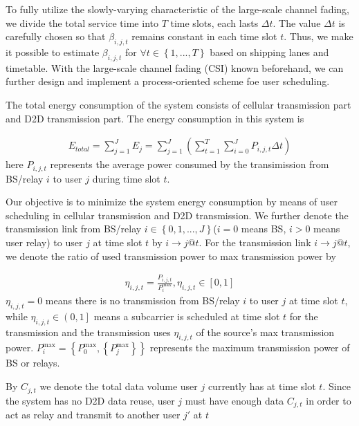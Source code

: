 \documentclass{ieeeaccess}
\begin{document}
To fully utilize the slowly-varying characteristic of the large-scale channel fading, we divide the total service time into $T$ time slots, each lasts $\Delta t$. The value $\Delta t$ is carefully chosen so that $\beta _{i,j,t}$ remains constant in each time slot $t$. Thus, we make it possible to estimate $\beta _{i,j,t}$ for $\forall t \in \left\{ {1,...,T} \right\}$ based on shipping lanes and timetable. With the large-scale channel fading (CSI) known beforehand, we can further design and implement a process-oriented scheme foe user scheduling.

The total energy consumption of the system consists of cellular transmission part and D2D transmission part. The energy consumption in this system is

\begin{align}
{{E_{total}} = \sum\limits_{j = 1}^J {{E_j}}  = \sum\limits_{j = 1}^J {\left( {\sum\limits_{t = 1}^T {\sum\limits_{i = 0}^J {{P_{i,j,t}}\Delta t} } } \right)} }
\end{align}
here ${P_{i,j,t}}$ represents the average power consumed by the transimission from BS/relay $i$ to user $j$ during time slot $t$.

Our objective is to minimize the system energy consumption by means of user scheduling in cellular transmission and D2D transmission. We further denote the transmission link from BS/relay $i \in \left\{ {0,1,...,J} \right\}$($i = 0$ means BS, $i > 0$ means user relay) to user $j$ at time slot $t$ by $i \to j@t$. For the transmission link $i \to j@t$, we denote the ratio of used transmission power to max transmission power by 

\begin{align}
{{\eta _{i,j,t}} = \frac{{{P_{i,j,t}}}}{{P_i^{\max }}},{\eta _{i,j,t}} \in \left[ {0,1} \right]}
\end{align}
${\eta _{i,j,t}} = 0$ means there is no transmission from BS/relay $i$ to user $j$ at time slot $t$, while ${\eta _{i,j,t}} \in \left( {0,1} \right]$ means a subcarrier is scheduled at time slot $t$ for the transmission and the transmission uses ${\eta _{i,j,t}}$ of the source's max transmission power. $P_i^{\max } = \left\{ {P_0^{\max },\left\{ {P_j^{\max }} \right\}} \right\}$ represents the maximum transmission power of BS or relays. 

By ${C_{j,t}}$ we denote the total data volume user $j$ currently has at time slot $t$. Since the system has no D2D data reuse, user $j$ must have enough data ${C_{j,t}}$ in order to act as relay and transmit to another user $j'$ at $t$
\end{document}
